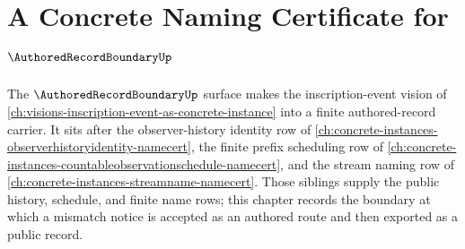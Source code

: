 \chapter{A Concrete Naming Certificate for $\AuthoredRecordBoundaryUp$}
\label{ch:concrete-instances-authoredrecordboundary-namecert}

The $\AuthoredRecordBoundaryUp$ surface makes the inscription-event vision of \autoref{ch:visions-inscription-event-as-concrete-instance} into a finite authored-record carrier. It sits after the observer-history identity row of \autoref{ch:concrete-instances-observerhistoryidentity-namecert}, the finite prefix scheduling row of \autoref{ch:concrete-instances-countableobservationschedule-namecert}, and the stream naming row of \autoref{ch:concrete-instances-streamname-namecert}. Those siblings supply the public history, schedule, and finite name rows; this chapter records the boundary at which a mismatch notice is accepted as an authored route and then exported as a public record.

